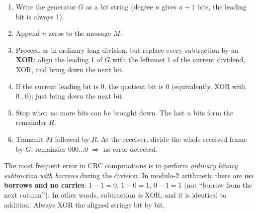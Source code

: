 \documentclass[11pt]{article}
\begin{document}
\begin{methode}
\begin{enumerate}
\item Write the generator $G$ as a bit string (degree $n$ gives $n+1$ bits, the leading bit is always 1).
\item Append $n$ zeros to the message $M$.
\item Proceed as in ordinary long division, but replace every subtraction by an \textbf{XOR}: align the leading 1 of $G$ with the leftmost 1 of the current dividend, XOR, and bring down the next bit.
\item If the current leading bit is 0, the quotient bit is 0 (equivalently, XOR with $0\ldots0$); just bring down the next bit.
\item Stop when no more bits can be brought down. The last $n$ bits form the remainder $R$.
\item Transmit $M$ followed by $R$. At the receiver, divide the whole received frame by $G$: remainder $000\ldots0$ $\Rightarrow$ no error detected.
\end{enumerate}
\end{methode}

\begin{attention}
The most frequent error in CRC computations is to perform \emph{ordinary binary subtraction with borrows} during the division. In modulo-2 arithmetic there are \textbf{no borrows and no carries}: $1 - 1 = 0$, $1 - 0 = 1$, $0 - 1 = 1$ (not ``borrow from the next column''). In other words, subtraction \emph{is} XOR, and it is identical to addition. Always XOR the aligned strings bit by bit.
\end{attention}
\end{document}
